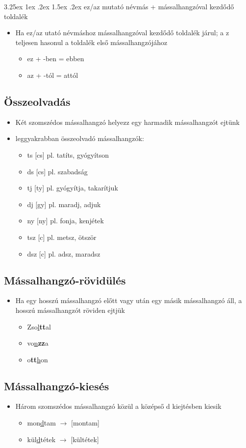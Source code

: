 \documentclass{article}
\makeatletter
\newcounter{subsubsubsection}[subsubsection]
\renewcommand\subsubsubsection{%
  \@startsection{subsubsubsection}{4}{\z@}%
  {3.25ex \@plus1ex \@minus.2ex}%
  {1.5ex \@plus .2ex}%
  {\normalfont\normalsize\bfseries}%
}
\makeatother
\begin{document}
\subsubsubsection{ez/az mutató névmás + mássalhangzóval kezdődő toldalék}
\begin{itemize}
    \item Ha ez/az  utató névmáshoz mássalhangzóval kezdődő toldalék járul; a z teljesen hasonul a toldalék első mássalhangzójához
    \begin{itemize}
        \item ez + -ben = ebben
        \item az + -tól = attól
    \end{itemize}
\end{itemize}




\subsection{Összeolvadás}
\begin{itemize}
    \item Két szomszédos mássalhangzó helyezz egy harmadik mássalhangzót ejtünk
    \item leggyakrabban összeolvadó mássalhangzók: \begin{itemize}
        \item ts [cs] pl. tatíts, gyógyítson
        \item ds [cs] pl. szabadság
        \item tj [ty] pl. gyógyítja, takarítjuk
        \item dj [gy] pl. maradj, adjuk
        \item ny [ny] pl. fonja, kenjétek
        \item tsz [c] pl. metsz, ötször
        \item dsz [c] pl. adsz, maradsz
    \end{itemize}
\end{itemize}

\subsection{Mássalhangzó-rövidülés}
\begin{itemize}
    \item Ha egy hosszú mássalhangzó előtt vagy után egy másik mássalhangzó áll, a hosszú mássalhangzót röviden ejtjük \begin{itemize}
        \item Zso\underline{l}\textbf{tt}al
        \item vo\underline{n}\textbf{zz}a
        \item o\textbf{tt}\underline{h}on
    \end{itemize}
\end{itemize}

\subsection{Mássalhangzó-kiesés}
\begin{itemize}
    \item Három szomszédos mássalhangzó közül a középső d kiejtésben kiesik \begin{itemize}
        \item mon\underline{d}tam $\rightarrow$ [montam]
        \item kül\underline{d}tétek $\rightarrow$ [kültétek]
    \end{itemize}
\end{itemize}
\end{document}
